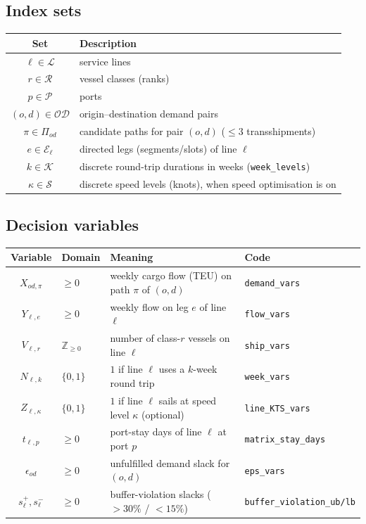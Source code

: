 \documentclass[11pt]{article}
\newcommand{\Z}{\mathbb{Z}}
\begin{document}
\subsection{Index sets}
\begin{table}[h]
\centering
\begin{tabular}{@{}cl@{}}
\toprule
Set & Description \\
\midrule
$\ell \in \mathcal{L}$ & service lines \\
$r \in \mathcal{R}$ & vessel classes (ranks) \\
$p \in \mathcal{P}$ & ports \\
$(o,d)\in \mathcal{OD}$ & origin--destination demand pairs \\
$\pi \in \Pi_{od}$ & candidate paths for pair $(o,d)$ ($\le 3$ transshipments) \\
$e \in \mathcal{E}_\ell$ & directed legs (segments/slots) of line $\ell$ \\
$k \in \mathcal{K}$ & discrete round-trip durations in weeks (\texttt{week\_levels}) \\
$\kappa \in \mathcal{S}$ & discrete speed levels (knots), when speed optimisation is on \\
\bottomrule
\end{tabular}
\end{table}

\subsection{Decision variables}
\begin{table}[h]
\centering
\begin{tabular}{@{}clp{6.3cm}l@{}}
\toprule
Variable & Domain & Meaning & Code \\
\midrule
$X_{od,\pi}$ & $\ge 0$ & weekly cargo flow (TEU) on path $\pi$ of $(o,d)$ & \texttt{demand\_vars} \\
$Y_{\ell,e}$ & $\ge 0$ & weekly flow on leg $e$ of line $\ell$ & \texttt{flow\_vars} \\
$V_{\ell,r}$ & $\Z_{\ge 0}$ & number of class-$r$ vessels on line $\ell$ & \texttt{ship\_vars} \\
$N_{\ell,k}$ & $\{0,1\}$ & $1$ if line $\ell$ uses a $k$-week round trip & \texttt{week\_vars} \\
$Z_{\ell,\kappa}$ & $\{0,1\}$ & $1$ if line $\ell$ sails at speed level $\kappa$ (optional) & \texttt{line\_KTS\_vars} \\
$t_{\ell,p}$ & $\ge 0$ & port-stay days of line $\ell$ at port $p$ & \texttt{matrix\_stay\_days} \\
$\epsilon_{od}$ & $\ge 0$ & unfulfilled demand slack for $(o,d)$ & \texttt{eps\_vars} \\
$s^{+}_\ell, s^{-}_\ell$ & $\ge 0$ & buffer-violation slacks ($>30\%$ / $<15\%$) & \texttt{buffer\_violation\_ub/lb} \\
\bottomrule
\end{tabular}
\end{table}
\end{document}
